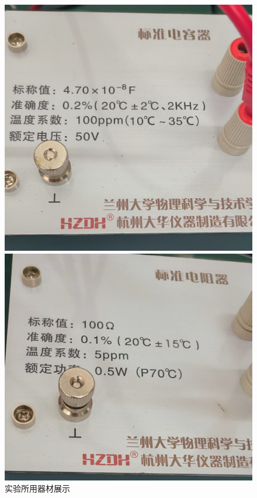 \documentclass{ctexart}
\begin{document}
\begin{figure}[htbp]
\begin{minipage}[t]{0.45\textwidth}
    \end{minipage}
    
    \begin{minipage}[t]{0.45\textwidth}
    \centering
    \includegraphics[width=\textwidth]{qicai3}
    \end{minipage}
    \hfill
    \begin{minipage}[t]{0.45\textwidth}
    \centering
    \includegraphics[width=\textwidth]{qicai4}
    \end{minipage}
    \caption{实验所用器材展示}
    \end{figure}
\end{document}
